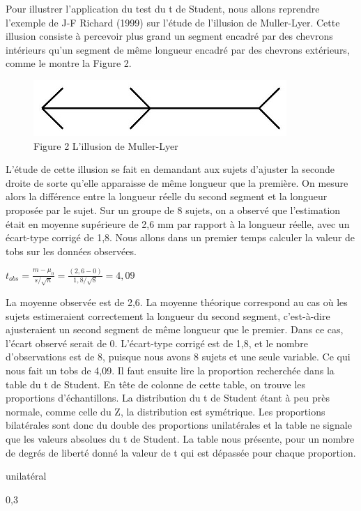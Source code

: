 \documentclass[]{book}
\theoremstyle{definition}
\theoremstyle{definition}
\theoremstyle{definition}
\theoremstyle{remark}
\begin{document}
Pour illustrer l'application du test du t de Student, nous allons
reprendre l'exemple de J-F Richard (1999) sur l'étude de l'illusion de
Muller-Lyer. Cette illusion consiste à percevoir plus grand un segment
encadré par des chevrons intérieurs qu'un segment de même longueur
encadré par des chevrons extérieurs, comme le montre la Figure 2.

\begin{figure}
\centering
\includegraphics{MullerLyer.jpg}
\caption{Figure 2 L'illusion de Muller-Lyer}
\end{figure}

L'étude de cette illusion se fait en demandant aux sujets d'ajuster la
seconde droite de sorte qu'elle apparaisse de même longueur que la
première. On mesure alors la différence entre la longueur réelle du
second segment et la longueur proposée par le sujet. Sur un groupe de 8
sujets, on a observé que l'estimation était en moyenne supérieure de 2,6
mm par rapport à la longueur réelle, avec un écart-type corrigé de 1,8.
Nous allons dans un premier temps calculer la valeur de tobs sur les
données observées.

\(t_{obs} = \frac{m-\mu _{0}}{s/\sqrt{n}} = \frac{(2,6-0)}{1,8/\sqrt{8}} = 4,09\)

La moyenne observée est de 2,6. La moyenne théorique correspond au cas
où les sujets estimeraient correctement la longueur du second segment,
c'est-à-dire ajusteraient un second segment de même longueur que le
premier. Dans ce cas, l'écart observé serait de 0. L'écart-type corrigé
est de 1,8, et le nombre d'observations est de 8, puisque nous avons 8
sujets et une seule variable. Ce qui nous fait un tobs de 4,09. Il faut
ensuite lire la proportion recherchée dans la table du t de Student. En
tête de colonne de cette table, on trouve les proportions
d'échantillons. La distribution du t de Student étant à peu près
normale, comme celle du Z, la distribution est symétrique. Les
proportions bilatérales sont donc du double des proportions unilatérales
et la table ne signale que les valeurs absolues du t de Student. La
table nous présente, pour un nombre de degrés de liberté donné la valeur
de t qui est dépassée pour chaque proportion.

unilatéral

0,3
\end{document}
